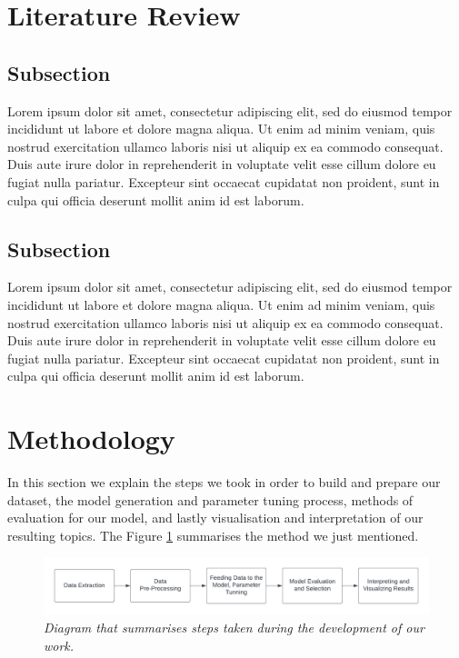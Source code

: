 \documentclass[twoside,12pt,a4paper]{article}
\begin{document}
\clearpage
\section{Literature Review}
\subsection{Subsection}
Lorem ipsum dolor sit amet, consectetur adipiscing elit, sed do eiusmod tempor incididunt ut labore et dolore magna aliqua. Ut enim ad minim veniam, quis nostrud exercitation ullamco laboris nisi ut aliquip ex ea commodo consequat. Duis aute irure dolor in reprehenderit in voluptate velit esse cillum dolore eu fugiat nulla pariatur. Excepteur sint occaecat cupidatat non proident, sunt in culpa qui officia deserunt mollit anim id est laborum.

\subsection{Subsection}
Lorem ipsum dolor sit amet, consectetur adipiscing elit, sed do eiusmod tempor incididunt ut labore et dolore magna aliqua. Ut enim ad minim veniam, quis nostrud exercitation ullamco laboris nisi ut aliquip ex ea commodo consequat. Duis aute irure dolor in reprehenderit in voluptate velit esse cillum dolore eu fugiat nulla pariatur. Excepteur sint occaecat cupidatat non proident, sunt in culpa qui officia deserunt mollit anim id est laborum.

\clearpage
\section{Methodology}
In this section we explain the steps we took in order to build and prepare our dataset, the model generation and parameter tuning process, methods of evaluation for our model, and lastly visualisation and interpretation of our resulting topics. The Figure \ref{fig:method_1} summarises the method we just mentioned.\\

\begin{figure}[h]
\centering
\includegraphics[scale=0.6]{method_1.png}
\caption{\textit{Diagram that summarises steps taken during the development of our work.}}
\label{fig:method_1}
\end{figure}
\end{document}
